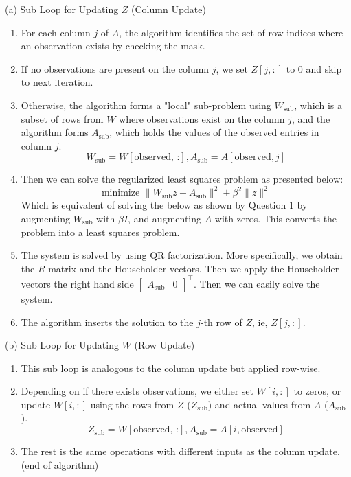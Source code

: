 \documentclass[11pt,onecolumn]{article}
\begin{document}
\noindent
 (a) Sub Loop for Updating $Z$ (Column Update)
\begin{enumerate}
\item For each column $j$ of $A$, the algorithm identifies the set of row indices where an observation exists by checking the mask.

\item If no observations are present on the column $j$, we set $Z[j, :]$ to 0 and skip to next iteration.

\item Otherwise, the algorithm forms a "local" sub-problem using $W_{\text{sub}}$, which is a subset of rows from $W$ where observations exist on the column $j$, and the algorithm forms $A_{\text{sub}}$, which holds the values of the observed entries in column $j$.
                $$W_{\text{sub}}=W[\text{observed, :}], A_{\text{sub}}=A[\text{observed}, j]$$
\item Then we can solve the regularized least squares problem as presented below:
$$\text{minimize }\|W_{\text{sub}}z - A_{\text{sub}}\|^2+\beta^2\|z\|^2$$
Which is equivalent of solving the below as shown by Question 1 by augmenting $W_{\text{sub}}$ with $\beta I$, and augmenting $A$ with zeros. This converts the problem into a least squares problem.

\item The system is solved by using QR factorization. More specifically, we obtain the $R$ matrix and the Householder vectors. Then we apply the Householder vectors the right hand side 
$
\begin{bmatrix}
    A_{\text{sub}} & 0
\end{bmatrix}^\top
$. Then we can easily solve the system.

\item The algorithm inserts the solution to the $j$-th row of $Z$, ie, $Z[j,:]$.
\end{enumerate}
(b) Sub Loop for Updating $W$ (Row Update)
\begin{enumerate}
 \item This sub loop is analogous to the column update but applied row-wise. 
 \item Depending on if there exists observations, we either set $W[i, :]$ to zeros, or update $W[i,:]$ using the rows from $Z$  ($Z_{\text{sub}}$) and actual values from $A$ ($A_{\text{sub}}$). 
 $$Z_{\text{sub}}=W[\text{observed, :}], A_{\text{sub}}=A[i, \text{observed}]$$
 \item The rest is the same operations with different inputs as the column update.
 (end of algorithm)
\end{enumerate}
\end{document}
